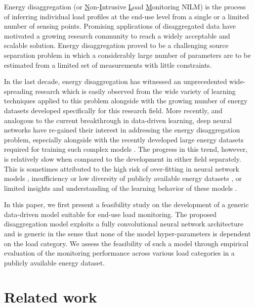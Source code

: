 \documentclass[twocolumn,letter,10pt]{IEEEtran} %
\begin{document}
Energy disaggregation (or \underline{N}on-\underline{I}ntrusive \underline{L}oad \underline{M}onitoring NILM) is the process of inferring individual load profiles at the end-use level from a single or a limited number of sensing points. Promising applications of disaggregated data have motivated a growing research community to reach a widely acceptable and scalable solution. Energy disaggregation  proved to be a challenging source separation problem in which a considerably large number of parameters are to be estimated from a limited set of measurements with little constraints.

In the last decade, energy disaggregation has witnessed an unprecedented wide-spreading research which is easily observed from the wide variety of learning techniques applied to this problem alongside with the growing number of energy datasets developed specifically for this research field. More recently, and analogous to the current breakthrough in data-driven learning, deep neural networks have re-gained their interest in addressing the energy disaggregation problem, especially alongside with the recently developed large energy datasets required for training such complex models \cite{Kaman_2017,Mauch_2015,Mauch_2016,Kelly_2015,Zhang_2016_SequenceToPointLearning,He_2016_AnEmpiricalStudy, Kelly_2015_UKDALE,Parson_2015_Dataport_NILMTK}. The progress in this trend, however, is relatively slow when compared to the development in either field separately. This is sometimes attributed to the high risk of over-fitting in neural network models \cite{Makonin_2014_PhD}, insufficiency or low diversity of publicly available energy datasets \cite{Kelly_2015}, or limited insights and understanding of the learning behavior of these models \cite{Zhang_2016_SequenceToPointLearning}.

In this paper, we first present a feasibility study on the development of a generic data-driven model suitable for end-use load monitoring. The proposed disaggregation model exploits a fully convolutional neural network architecture and is generic in the sense that none of the model hyper-parameters is dependent on the load category. We assess the feasibility of such a model through empirical evaluation of the monitoring performance across various load categories in a publicly available energy dataset.



\section{Related work}
\label{sec:related-work}
\end{document}
